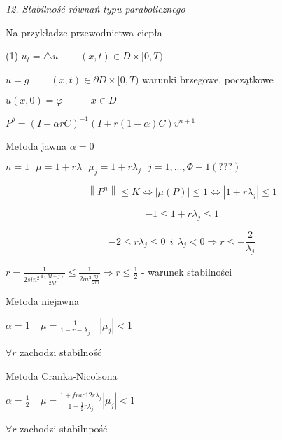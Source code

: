 \textit{12. Stabilność równań typu parabolicznego}

Na przykładze przewodnictwa ciepła

(1) $u_t = \bigtriangleup u\ \ \ \ \ \ \ \ \ \ (x,t) \in D \times [0,T)$

$u = g\ \ \ \ \ \ \ \ \ \ (x,t) \in \partial D \times [0,T)$ warunki brzegowe, początkowe

$u(x,0) = \varphi\ \ \ \ \ \ \ \ \ \ \ \ \ x \in D$

$P^b = (I - \alpha rC)^{-1}(I + r(1-\alpha)C)v^{n+1}$

Metoda jawna $\alpha = 0$

$n = 1\ \ \ \mu = 1 + r \lambda\ \ \ \mu _j = 1 + r \lambda _j \ \ \ j = 1,...,\Phi - 1 (???)$

\[ \left \| P^n \right \| \leqslant K \Leftrightarrow \left | \mu (P) \right | \leqslant 1 \Leftrightarrow \left | 1 + r\lambda _j \right | \leqslant 1 \]

\[-1 \leqslant 1 + r \lambda _j \leqslant 1\]

\[-2 \leqslant r \lambda _j \leqslant 0\ \ i\ \ \lambda _j < 0 \Rightarrow r \leqslant - \frac{2}{\lambda _j} \]

$r = \frac{1}{2 sin^2 \frac{4(M-j)}{2M}} \leqslant \frac{1}{2m^2 \frac{\pi j}{2m}} \Rightarrow r \leqslant \frac{1}{2}$ - warunek stabilności

Metoda niejawna

$\alpha = 1\ \ \ \ \ \mu = \frac{1}{1 - r - \lambda _j}\ \ \ \  \left | \mu _j \right | < 1$

$\forall r$ zachodzi stabilność

Metoda Cranka-Nicolsona

$\alpha = \frac{1}{2}\ \ \ \ \ \mu = \frac{1 + frac{1}{2}r \lambda _j}{1 - \frac{1}{2}r \lambda _j}  \left | \mu _j \right | < 1$

$\forall r$ zachodzi stabilnpość